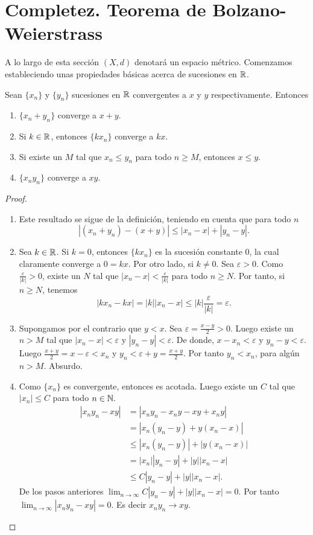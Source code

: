 \section{Completez. Teorema de Bolzano-Weierstrass}

A lo largo de esta sección $(X,d)$ denotará un espacio métrico.
Comenzamos estableciendo unas propiedades básicas acerca de sucesiones en $\mathbb{R}$.

\begin{teorema}\label{pro-basi-suces}
Sean $\{x_n\}$ y $\{y_n\}$ sucesiones en $\mathbb{R}$ convergentes a $x$ y $y$ respectivamente. Entonces
\begin{enumerate}
    \item $\{x_n+y_n\}$ converge a $x+y$.
    \item Si $k\in \mathbb{R}$, entonces $\{k x_n\}$ converge a $kx$.
    \item Si existe un $M$ tal que $x_n \leq y_n$ para todo $n\geq M$, entonces $x\leq y$.  
        \item $\{x_ny_n\}$ converge a $xy$.
\end{enumerate}
\end{teorema}
\begin{proof}
\begin{enumerate}
    \item Este resultado se sigue de la definición, teniendo en cuenta que para todo $n$
    \[|(x_n+y_n)-(x+y)|\leq|x_n-x|+|y_n-y|.\]
    \item Sea $k\in \mathbb{R}$. Si $k=0$, entonces $\{k x_n\}$ es la sucesión constante $0$, la cual claramente converge a $0=kx$. Por otro lado, si $k\neq 0$. Sea $\varepsilon >0$. Como $\frac{\varepsilon}{|k|}>0$, existe un $N$ tal que $|x_n-x|<\frac{\varepsilon}{|k|}$ para todo $n\geq N$. Por tanto, si $n\geq N$, tenemos
    \[|kx_n-kx|=|k||x_n-x|\leq |k|\frac{\varepsilon}{|k|}=\varepsilon.\]
    \item Supongamos por el contrario que $y<x$. Sea $\varepsilon=\frac{x-y}{2}>0.$ Luego existe un $n>M$ tal que $|x_n-x|<\varepsilon$ y  $|y_n-y|<\varepsilon$. De donde,
    $x-x_n<\varepsilon$ y $y_n-y<\varepsilon$. Luego $\frac{x+y}{2}=x-\varepsilon<x_n$ y $y_n<\varepsilon+y=\frac{x+y}{2}$. Por tanto $y_n<x_n$, para algún $n>M$. Absurdo.
    \item Como $\{x_n\}$ es convergente, entonces es acotada. Luego existe un $C$ tal que $|x_n|\leq C$ para todo $n\in  \mathbb{N}.$
    \begin{align*}
    |x_ny_n-xy|& =|x_ny_n-x_ny-xy+x_ny| \\
    & = |x_n(y_n-y)+y(x_n-x)| \\
    & \leq |x_n(y_n-y)|+|y(x_n-x)|\\
    &=|x_n||y_n-y|+|y||x_n-x|\\
    &\leq C|y_n-y|+|y||x_n-x|.
    \end{align*}
        De los pasos anteriores $\lim_{n\to \infty}C|y_n-y|+|y||x_n-x|=0 .$ Por tanto $\lim_{n\to \infty}|x_ny_n-xy|=0.$
    Es decir $x_ny_n\to xy.$
\end{enumerate}
\end{proof}

